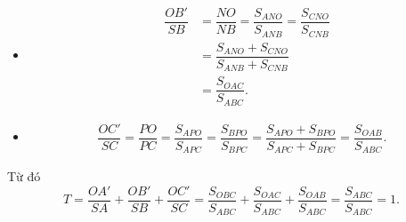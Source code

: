\begin{ex}
{\begin{itemize}
\begin{eqnarray*}
				&&=\dfrac{S_{CMO}+S_{BMO}}{S_{CMA}+S_{BMA}}\\ 
				&&=\dfrac{S_{OBC}}{S_{ABC}}. 
			\end{eqnarray*}
			 \item
			\begin{eqnarray*}
				 &\dfrac{OB'}{SB}&=\dfrac{NO}{NB}=\dfrac{S_{ANO}}{S_{ANB}}=\dfrac{S_{CNO}}{S_{CNB}}\\
				 &&=\dfrac{S_{ANO}+S_{CNO}}{S_{ANB}+S_{CNB}}\\
				 &&=\dfrac{S_{OAC}}{S_{ABC}}.
			\end{eqnarray*}
			 \item
			\begin{eqnarray*}
				\dfrac{OC'}{SC}=\dfrac{PO}{PC}=\dfrac{S_{APO}}{S_{APC}} 
				=\dfrac{S_{BPO}}{S_{BPC}}=\dfrac{S_{APO}+S_{BPO}}{S_{APC}+S_{BPC}}=\dfrac{S_{OAB}}{S_{ABC}}. 
			\end{eqnarray*}
		\end{itemize}
		\noindent Từ  đó \[T=\dfrac{OA'}{SA}+\dfrac{OB'}{SB}+\dfrac{OC'}{SC}=\dfrac{S_{OBC}}{S_{ABC}}+\dfrac{S_{OAC}}{S_{ABC}}+\dfrac{S_{OAB}}{S_{ABC}}=\dfrac{S_{ABC}}{S_{ABC}}=1.\]
	} 
\end{ex}

